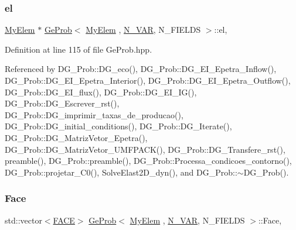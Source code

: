 \subsubsection{\texorpdfstring{el}{el}}
{\footnotesize\ttfamily \hyperlink{DG__Prob_8h_a83cd887ced9a6587428f267e50cd4787}{My\+Elem} $\ast$ \hyperlink{classGeProb}{Ge\+Prob}$<$ \hyperlink{DG__Prob_8h_a83cd887ced9a6587428f267e50cd4787}{My\+Elem} , \hyperlink{classED__Prob_a4e7d2ff1a8e435e336fb00c527224b5a}{N\+\_\+\+V\+AR}, N\+\_\+\+F\+I\+E\+L\+DS $>$\+::el\hspace{0.3cm}{\ttfamily [protected]}, {\ttfamily [inherited]}}



Definition at line 115 of file Ge\+Prob.\+hpp.



Referenced by D\+G\+\_\+\+Prob\+::\+D\+G\+\_\+eco(), D\+G\+\_\+\+Prob\+::\+D\+G\+\_\+\+E\+I\+\_\+\+Epetra\+\_\+\+Inflow(), D\+G\+\_\+\+Prob\+::\+D\+G\+\_\+\+E\+I\+\_\+\+Epetra\+\_\+\+Interior(), D\+G\+\_\+\+Prob\+::\+D\+G\+\_\+\+E\+I\+\_\+\+Epetra\+\_\+\+Outflow(), D\+G\+\_\+\+Prob\+::\+D\+G\+\_\+\+E\+I\+\_\+flux(), D\+G\+\_\+\+Prob\+::\+D\+G\+\_\+\+E\+I\+\_\+\+I\+G(), D\+G\+\_\+\+Prob\+::\+D\+G\+\_\+\+Escrever\+\_\+rst(), D\+G\+\_\+\+Prob\+::\+D\+G\+\_\+imprimir\+\_\+taxas\+\_\+de\+\_\+producao(), D\+G\+\_\+\+Prob\+::\+D\+G\+\_\+initial\+\_\+conditions(), D\+G\+\_\+\+Prob\+::\+D\+G\+\_\+\+Iterate(), D\+G\+\_\+\+Prob\+::\+D\+G\+\_\+\+Matriz\+Vetor\+\_\+\+Epetra(), D\+G\+\_\+\+Prob\+::\+D\+G\+\_\+\+Matriz\+Vetor\+\_\+\+U\+M\+F\+P\+A\+C\+K(), D\+G\+\_\+\+Prob\+::\+D\+G\+\_\+\+Transfere\+\_\+rst(), preamble(), D\+G\+\_\+\+Prob\+::preamble(), D\+G\+\_\+\+Prob\+::\+Processa\+\_\+condicoes\+\_\+contorno(), D\+G\+\_\+\+Prob\+::projetar\+\_\+\+C0(), Solve\+Elast2\+D\+\_\+dyn(), and D\+G\+\_\+\+Prob\+::$\sim$\+D\+G\+\_\+\+Prob().

\mbox{\label{classGeProb_af050a3c4e639bd19028c49877aa10583}} 
\subsubsection{\texorpdfstring{Face}{Face}}
{\footnotesize\ttfamily std\+::vector$<$\hyperlink{structFACE}{F\+A\+CE}$>$ \hyperlink{classGeProb}{Ge\+Prob}$<$ \hyperlink{DG__Prob_8h_a83cd887ced9a6587428f267e50cd4787}{My\+Elem} , \hyperlink{classED__Prob_a4e7d2ff1a8e435e336fb00c527224b5a}{N\+\_\+\+V\+AR}, N\+\_\+\+F\+I\+E\+L\+DS $>$\+::Face\hspace{0.3cm}{\ttfamily [protected]}, {\ttfamily [inherited]}}



